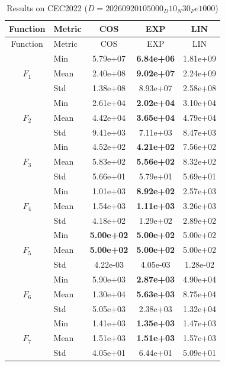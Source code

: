 \begin{center}
\small
\renewcommand{\arraystretch}{1.25}
\begin{longtable}{clccc}
\caption{Results on CEC2022 ($D=20260920105000_D10_N30_Fe1000$) }
\label{tab:results_CEC2022_20260920105000_D10_N30_Fe1000} \\
\toprule
Function & Metric & COS & EXP & LIN \\
\midrule
\endfirsthead
\toprule
Function & Metric & COS & EXP & LIN \\
\midrule
\endhead
\multirow{3}{*}{$F_{1}$} & Min & 5.79e+07 & \textbf{6.84e+06} & 1.81e+09 \\
 & Mean & 2.40e+08 & \textbf{9.02e+07} & 2.24e+09 \\
 & Std & 1.38e+08 & 8.93e+07 & 2.58e+08 \\
\midrule
\multirow{3}{*}{$F_{2}$} & Min & 2.61e+04 & \textbf{2.02e+04} & 3.10e+04 \\
 & Mean & 4.42e+04 & \textbf{3.65e+04} & 4.79e+04 \\
 & Std & 9.41e+03 & 7.11e+03 & 8.47e+03 \\
\midrule
\multirow{3}{*}{$F_{3}$} & Min & 4.52e+02 & \textbf{4.21e+02} & 7.56e+02 \\
 & Mean & 5.83e+02 & \textbf{5.56e+02} & 8.32e+02 \\
 & Std & 5.66e+01 & 5.79e+01 & 5.69e+01 \\
\midrule
\multirow{3}{*}{$F_{4}$} & Min & 1.01e+03 & \textbf{8.92e+02} & 2.57e+03 \\
 & Mean & 1.54e+03 & \textbf{1.11e+03} & 3.26e+03 \\
 & Std & 4.18e+02 & 1.29e+02 & 2.89e+02 \\
\midrule
\multirow{3}{*}{$F_{5}$} & Min & \textbf{5.00e+02} & \textbf{5.00e+02} & 5.00e+02 \\
 & Mean & \textbf{5.00e+02} & \textbf{5.00e+02} & 5.00e+02 \\
 & Std & 4.22e-03 & 4.05e-03 & 1.28e-02 \\
\midrule
\multirow{3}{*}{$F_{6}$} & Min & 5.90e+03 & \textbf{2.87e+03} & 4.90e+04 \\
 & Mean & 1.30e+04 & \textbf{5.63e+03} & 8.75e+04 \\
 & Std & 5.05e+03 & 2.38e+03 & 1.32e+04 \\
\midrule
\multirow{3}{*}{$F_{7}$} & Min & 1.41e+03 & \textbf{1.35e+03} & 1.47e+03 \\
 & Mean & 1.51e+03 & \textbf{1.51e+03} & 1.57e+03 \\
 & Std & 4.05e+01 & 6.44e+01 & 5.09e+01 \\

\end{longtable}
\end{center}

